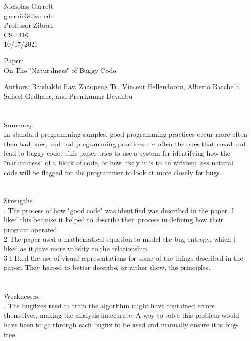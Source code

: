 \documentclass[12pt, a4paper]{article}
\begin{document}
\noindent
Nicholas Garrett\\
garrnic3@isu.edu\\ 
Professor Zibran \\
CS 4416\\
10/17/2021 \\


\begin{center}
\end{center}

\noindent
Paper:\\
	\indent
	On The "Naturalness" of Buggy Code

	Authors: Baishakhi Ray, Zhaopeng Tu, Vincent Hellendoorn, Alberto Bacchelli, Saheel Godhane, and Premkumar Devanbu\\ \\ \\
	
\noindent	
Summary:\\
	\indent
	In standard programming samples, good programming practices occur more often then bad ones, and bad programming practices are often the ones that cread and lead to buggy code.  This paper tries to use a system for identifying how the "naturalness" of a block of code, or how likely it is to be written; less natural code will be flagged for the programmer to look at more closely for bugs. \\ \\ \\

\noindent
Strengths:\\
.  The process of how "good code" was identified was described in the paper. I liked this because it helped to describe their process in defining how their program operated.\\

	2   The paper used a mathematical equation to model the bug entropy, which I liked as it gave more validity to the relationship.\\

	3   I liked the use of visual representations for some of the things described in the paper.  They helped to better describe, or rather show, the principles. \\ \\ \\

\noindent
Weaknesses: \\
. The bugfixes used to train the algorithm might have contained errors themselves, making the analysis inaccurate.  A way to solve this problem would have been to go through each bugfix to be used and manually ensure it is bug-free.   \\
\end{document}
